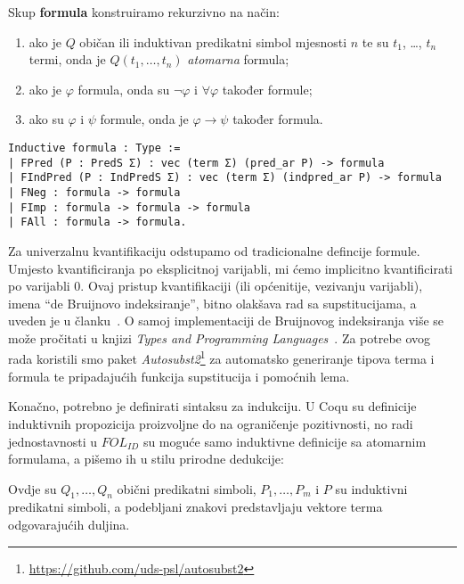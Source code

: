 \begin{definition}\label{def:formula}
  Skup \textbf{formula} konstruiramo rekurzivno na način:
  \begin{enumerate}
  \item ako je \(Q\) običan ili induktivan predikatni simbol mjesnosti \(n\) te su \(t_{1}\), \ldots, \(t_{n}\) termi,
    onda je \(Q(t_{1}, \ldots, t_{n})\) \textit{atomarna} formula;
  \item ako je \(\varphi\) formula, onda su \(\neg\varphi\) i \(\forall\varphi\) također formule;
  \item ako su \(\varphi\) i \(\psi\) formule, onda je \(\varphi \rightarrow \psi\) također formula.
  \end{enumerate}
\begin{verbatim}
Inductive formula : Type :=
| FPred (P : PredS Σ) : vec (term Σ) (pred_ar P) -> formula 
| FIndPred (P : IndPredS Σ) : vec (term Σ) (indpred_ar P) -> formula 
| FNeg : formula -> formula 
| FImp : formula -> formula -> formula 
| FAll : formula -> formula.
\end{verbatim}
\end{definition}
\noindent Za univerzalnu kvantifikaciju odstupamo od tradicionalne defincije formule.
Umjesto kvantificiranja po eksplicitnoj varijabli,
mi ćemo implicitno kvantificirati po varijabli \(0\).
Ovaj pristup kvantifikaciji (ili općenitije, vezivanju varijabli), imena \enquote{de Bruijnovo indeksiranje}, bitno olakšava rad sa supstitucijama, a uveden je u članku~\cite{debruijnamelessdummies}.
O samoj implementaciji de Bruijnovog indeksiranja više se može pročitati u knjizi
\textit{Types and Programming Languages}~\cite{pierce2002tapl}.
Za potrebe ovog rada koristili smo paket \textit{Autosubst2}\footnote{\url{https://github.com/uds-psl/autosubst2}} za automatsko generiranje tipova terma i formula te
pripadajućih funkcija supstitucija i pomoćnih lema.


Konačno, potrebno je definirati sintaksu za indukciju.
U Coqu su definicije induktivnih propozicija proizvoljne do na ograničenje pozitivnosti,
no radi jednostavnosti u \(\mathit{FOL_{ID}}\) su moguće samo
induktivne definicije sa atomarnim formulama, a pišemo ih u stilu prirodne dedukcije:
\begin{prooftree}
\end{prooftree}
\noindent Ovdje su \(Q_{1}, \ldots, Q_{n}\) obični predikatni simboli, \(P_{1}, \ldots, P_{m}\) i \(P\) su induktivni predikatni simboli,
a podebljani znakovi predstavljaju vektore terma odgovarajućih duljina.

